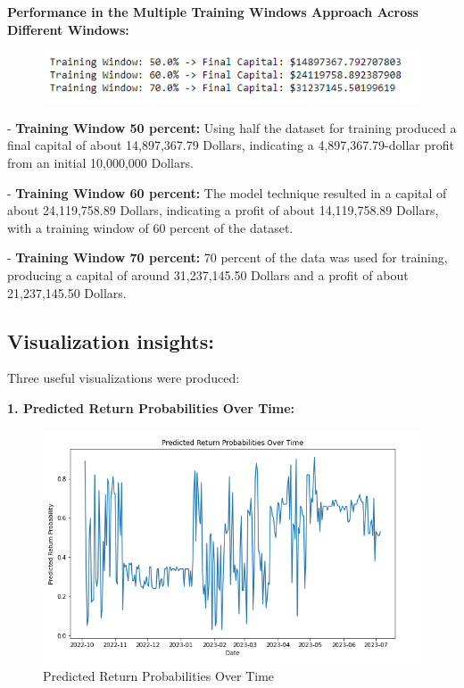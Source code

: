\medskip

\textbf{Performance in the Multiple Training Windows Approach Across Different Windows:}

\begin{figure}[H]
\centering
\includegraphics[scale=0.85]{fig4.jpg}
\end{figure}

-	\textbf{Training Window 50 percent:} Using half the dataset for training produced a final capital of about 14,897,367.79 Dollars, indicating a 4,897,367.79-dollar profit from an initial 10,000,000 Dollars.

-	\textbf{Training Window 60 percent:} The model technique resulted in a capital of about 24,119,758.89 Dollars, indicating a profit of about 14,119,758.89 Dollars, with a training window of 60 percent of the dataset.

-	\textbf{Training Window 70 percent:}  70 percent of the data was used for training, producing a capital of around 31,237,145.50 Dollars and a profit of about 21,237,145.50 Dollars.



\subsection{Visualization insights:}

Three useful visualizations were produced:

\textbf{1. Predicted Return Probabilities Over Time:} 

\begin{figure}[H]
\centering
\includegraphics[scale=0.85]{fig5.jpg}
\caption{Predicted Return Probabilities Over Time}
\label{Predicted Return Probabilities Over Time}
\end{figure}

